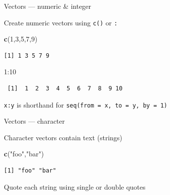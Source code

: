 \documentclass[10pt,ignorenonframetext,compress, aspectratio=169]{beamer}
\newenvironment{Shaded}{\begin{snugshade}}{\end{snugshade}}
\newcommand{\KeywordTok}[1]{\textcolor[rgb]{0.13,0.29,0.53}{\textbf{{#1}}}}
\newcommand{\DecValTok}[1]{\textcolor[rgb]{0.00,0.00,0.81}{{#1}}}
\newcommand{\StringTok}[1]{\textcolor[rgb]{0.31,0.60,0.02}{{#1}}}
\newcommand{\NormalTok}[1]{{#1}}
\begin{document}
\begin{frame}[fragile]{Vectors --- numeric \& integer}

Create numeric vectors using \texttt{c()} or \texttt{:}

\scriptsize

\begin{Shaded}
\begin{Highlighting}[]
\KeywordTok{c}\NormalTok{(}\DecValTok{1}\NormalTok{,}\DecValTok{3}\NormalTok{,}\DecValTok{5}\NormalTok{,}\DecValTok{7}\NormalTok{,}\DecValTok{9}\NormalTok{)}
\end{Highlighting}
\end{Shaded}

\begin{verbatim}
[1] 1 3 5 7 9
\end{verbatim}

\begin{Shaded}
\begin{Highlighting}[]
\DecValTok{1}\NormalTok{:}\DecValTok{10}
\end{Highlighting}
\end{Shaded}

\begin{verbatim}
 [1]  1  2  3  4  5  6  7  8  9 10
\end{verbatim}

\normalsize

\texttt{x:y} is shorthand for \texttt{seq(from = x, to = y, by = 1)}

\end{frame}

\begin{frame}[fragile]{Vectors --- character}

Character vectors contain text (strings)

\scriptsize

\begin{Shaded}
\begin{Highlighting}[]
\KeywordTok{c}\NormalTok{(}\StringTok{"foo"}\NormalTok{,}\StringTok{"bar"}\NormalTok{)}
\end{Highlighting}
\end{Shaded}

\begin{verbatim}
[1] "foo" "bar"
\end{verbatim}

\normalsize

Quote each string using single or double quotes

\end{frame}
\end{document}
